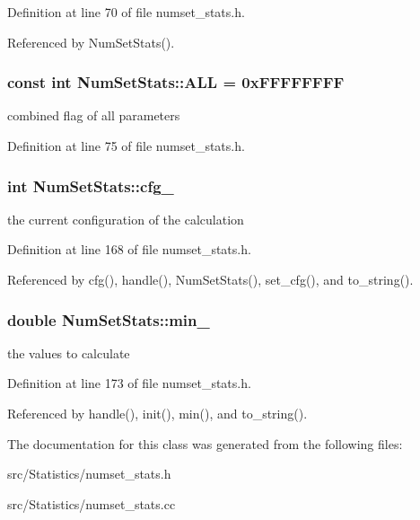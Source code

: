 Definition at line 70 of file numset\_\-stats.h.

Referenced by NumSetStats().\hypertarget{class_num_set_stats_4e4f9d0b733c13f3c6feb99cde24bcec}{
\subsubsection[ALL]{\setlength{\rightskip}{0pt plus 5cm}const int {\bf NumSetStats::ALL} = 0xFFFFFFFF}}
\label{class_num_set_stats_4e4f9d0b733c13f3c6feb99cde24bcec}


combined flag of all parameters 

Definition at line 75 of file numset\_\-stats.h.\hypertarget{class_num_set_stats_a70473f5a35e86e19224550b7a919871}{
\subsubsection[cfg\_\-]{\setlength{\rightskip}{0pt plus 5cm}int {\bf NumSetStats::cfg\_\-}}}
\label{class_num_set_stats_a70473f5a35e86e19224550b7a919871}


the current configuration of the calculation 

Definition at line 168 of file numset\_\-stats.h.

Referenced by cfg(), handle(), NumSetStats(), set\_\-cfg(), and to\_\-string().\hypertarget{class_num_set_stats_e268eba5a003e3932b16e90ce8bad405}{
\subsubsection[min\_\-]{\setlength{\rightskip}{0pt plus 5cm}double {\bf NumSetStats::min\_\-}}}
\label{class_num_set_stats_e268eba5a003e3932b16e90ce8bad405}


the values to calculate 

Definition at line 173 of file numset\_\-stats.h.

Referenced by handle(), init(), min(), and to\_\-string().

The documentation for this class was generated from the following files:\begin{CompactItemize}
\item 
src/Statistics/numset\_\-stats.h\item 
src/Statistics/numset\_\-stats.cc\end{CompactItemize}
